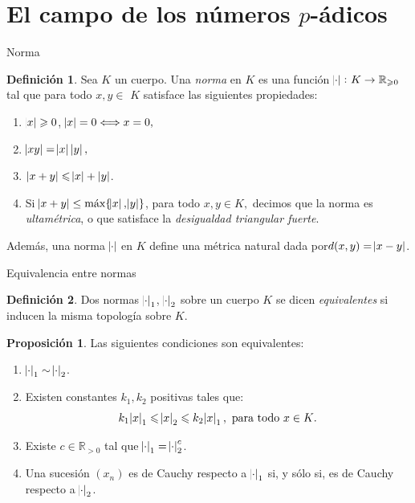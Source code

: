 \documentclass{beamer}
\newcommand{\bb}[1]{\mathbb{#1}}
\theoremstyle{definition}
\numberwithin{equation}{section}
\newcommand{\marine}[1]{\textcolor{defColor}{#1}}
\newcommand{\orangee}[1]{\textcolor{thColor}{#1}}
\newtheorem{df}{\marine{Definición}}
\newtheorem{pr}{\orangee{Proposición}}
\newcommand{\tit}[1]{\textit{#1}}
\renewcommand{\geq}{\geqslant}
\renewcommand{\leq}{\leqslant}
\newcommand{\R}{\mathbb{R}}
\newcommand{\maxx}[1]{\text{m\'ax} #1}
\begin{document}
\section{El campo de los números $p$-ádicos}
\begin{frame}{Norma}
\begin{df}\label{pnorm}
	Sea $K$ un cuerpo. Una \textit{norma} en $K$ es una función
	$\abs{\cdot}\colon K \to \R_{\geq 0}$ tal que para todo $x,y\in$ $K$
	satisface las siguientes propiedades:
	
	\begin{enumerate}[<+- | alert@+>]
		\item $\abs{x} \geq0$, $\abs{x}
		=0\Longleftrightarrow x=0,$
		
		\item $\abs{xy}  =\abs{x} \left\vert 
		y\right\vert ,$
		
		\item $\left\vert x+y\right\vert \leq\abs{x} +\left\vert y\right\vert$.
		\item Si $\abs{x+y} \le \maxx\{\abs{x}, \abs{y}\}$, para todo $x,y\in K,$ decimos que la norma es \tit{ultamétrica}, o que satisface la \tit{desigualdad triangular fuerte}.
	\end{enumerate}
\end{df}
	Además, una norma $\abs{\cdot}$ en $K$ define una métrica natural dada por\linebreak ${d (x,y)=\abs{x-y}}$.
\end{frame}
\begin{frame}{Equivalencia entre normas}
\begin{df}
	Dos normas $\abs{\cdot}_1$, $\abs{\cdot}_2$ sobre un cuerpo $K$ se dicen \tit{equivalentes }si inducen la misma topología sobre $K$.
\end{df}

\begin{pr}\label{quiv_power}
	Las siguientes condiciones son equivalentes:
	\begin{enumerate}
		\item $\abs{\cdot}_1\sim\abs{\cdot}_2$.
		\item Existen constantes $k_1,k_2$ positivas tales que:
		$$k_1\abs{x}_1\leq\abs{x}_2\leq k_2\abs{x}_1,\text{ para todo $x\in K$.}$$ 
		\item Existe $c\in\bb{R}_{>0}$ tal que $\abs{\cdot}_1=\abs{\cdot}_2^c$.	
		\item Una sucesión $ (x_n)$ es de Cauchy respecto a $\abs{\cdot}_1$ si, y sólo si, es de Cauchy respecto a $\abs{\cdot}_2$.
	\end{enumerate}

\end{pr}
\end{frame}
\end{document}
